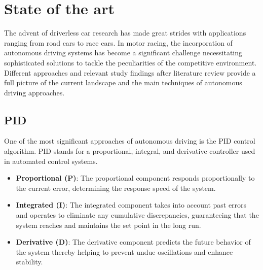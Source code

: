 \documentclass[conference]{IEEEtran}
\begin{document}
\section{State of the art}




The advent of driverless car research has made great strides with applications ranging from road cars to race cars.
%
In motor racing, the incorporation of autonomous driving systems has become a significant challenge necessitating sophisticated solutions to tackle the peculiarities of the competitive environment.
%
Different approaches and relevant study findings after literature review provide a full picture of the current landscape and the main techniques of autonomous driving approaches.

%
%
%
\subsection{PID}

One of the most significant approaches of autonomous driving is the PID control algorithm.
%
PID stands for a proportional, integral, and derivative controller used in automated control systems.

\begin{itemize}
    \item \textbf{Proportional (P)}: The proportional component responds proportionally to the current error, determining the response speed of the system.

    \item \textbf{Integrated (I)}: The integrated component takes into account past errors and operates to eliminate any cumulative discrepancies, guaranteeing that the system reaches and maintains the set point in the long run.

    \item \textbf{Derivative (D)}: The derivative component predicts the future behavior of the system thereby helping to prevent undue oscillations and enhance stability.

\end{itemize}
\end{document}

